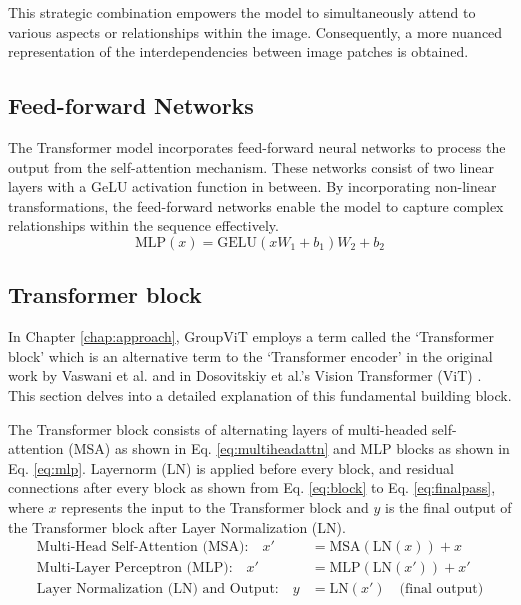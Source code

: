 This strategic combination empowers the model to simultaneously attend to various aspects or relationships within the image. Consequently, a more nuanced representation of the interdependencies between image patches is obtained.



\subsection{ Feed-forward Networks}
The Transformer model incorporates feed-forward neural networks to process the output from the self-attention mechanism. These networks consist of two linear layers with a GeLU activation function in between\cite{hendrycks2016gaussian}. By incorporating non-linear transformations, the feed-forward networks enable the model to capture complex relationships within the sequence effectively.
\begin{equation}
\label{eq:mlp}
\text{MLP}(x) = \text{GELU}(xW_1 + b_1)W_2 + b_2
\end{equation}


\subsection{Transformer block}
In Chapter \ref{chap:approach}, GroupViT employs a term called the `Transformer block' which is an alternative term to the `Transformer encoder' in the original work by Vaswani et al. \cite{vaswani2017attention} and in Dosovitskiy et al.'s Vision Transformer (ViT) \cite{dosovitskiy2020image}. This section delves into a detailed explanation of this fundamental building block.

The Transformer block consists of alternating layers of multi-headed self-attention (MSA) as shown in Eq. \ref{eq:multiheadattn} and MLP blocks as shown in Eq. \ref{eq:mlp}. Layernorm (LN) \cite{qiao2019micro} is applied before every block, and residual connections \cite{baevski2018adaptive} after every block as shown from Eq. \ref{eq:block} to Eq. \ref{eq:finalpass}, where \(x\) represents the input to the Transformer block and 
\(y\) is the final output of the Transformer block after Layer Normalization (LN).
\begin{align}
\label{eq:block}
\text{Multi-Head Self-Attention (MSA):} \quad x' &= \text{MSA}(\text{LN}(x)) + x \\
\label{eq:mlppass}
\text{Multi-Layer Perceptron (MLP):} \quad x' &= \text{MLP}(\text{LN}(x')) + x' \\
\label{eq:finalpass}
\text{Layer Normalization (LN) and Output:} \quad y &= \text{LN}(x') \quad \text{(final output)}
\end{align}

